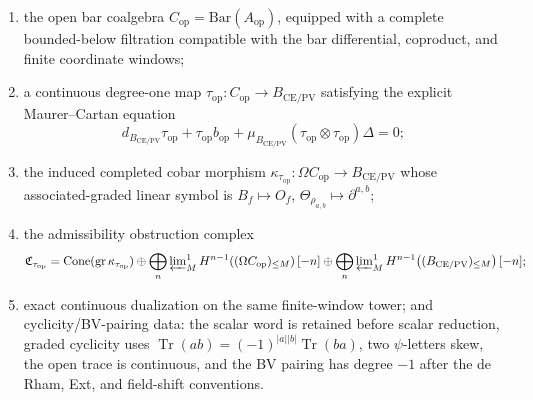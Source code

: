 \documentclass[11pt]{memoir}
\begin{document}
\begin{defn}
\begin{enumerate}[label=(K\arabic*)]
\[        C^\bullet_{\mathrm{CE},\mathrm{cont}}(\mathfrak g_{\mathrm{adm}})
          \cong
        \mathrm{PV}\bigl(
          \widehat{\mathbf S}_{\mathrm{coord}}(\mathfrak h_{\mathrm{adm}})
        \bigr),
      \]
      with the generator dictionary \(c^\rho\mapsto\partial_\rho\),
      \(u_f\mapsto O_f\), and
      \(d_{\mathrm{CE}}u_f\mapsto X_f\);
    \item the open bar coalgebra
      \(C_{\mathrm{op}}=\mathrm{Bar}(A_{\mathrm{op}})\), equipped with
      a complete bounded-below filtration compatible with the bar
      differential, coproduct, and finite coordinate windows;
    \item a continuous degree-one map
      \(\tau_{\mathrm{op}}\colon C_{\mathrm{op}}\to B_{\mathrm{CE/PV}}\)
      satisfying the explicit Maurer--Cartan equation
      \[
        d_{B_{\mathrm{CE/PV}}}\tau_{\mathrm{op}}
        +\tau_{\mathrm{op}} b_{\mathrm{op}}
        +\mu_{B_{\mathrm{CE/PV}}}
          (\tau_{\mathrm{op}}\otimes\tau_{\mathrm{op}})\Delta
        =0;
      \]
    \item the induced completed cobar morphism
      \(\kappa_{\tau_{\mathrm{op}}}\colon\Omega C_{\mathrm{op}}\to
      B_{\mathrm{CE/PV}}\) whose associated-graded linear symbol is
      \(B_f\mapsto O_f\), \(\Theta_{\rho_{a,b}}\mapsto\partial^{a,b}\);
    \item the admissibility obstruction complex
      \[
        \mathfrak C_{\tau_{\mathrm{op}}}
          =
        \operatorname{Cone}(
          \operatorname{gr}\kappa_{\tau_{\mathrm{op}}})
          \oplus
        \bigoplus_n\varprojlim\nolimits^1_M
          H^{n-1}\!\left((\Omega C_{\mathrm{op}})_{\leq M}\right)[-n]
          \oplus
        \bigoplus_n\varprojlim\nolimits^1_M
          H^{n-1}\!\left((B_{\mathrm{CE/PV}})_{\leq M}\right)[-n];
      \]
    \item exact continuous dualization on the same finite-window tower;
      and cyclicity/BV-pairing data: the scalar word is retained
      before scalar reduction, graded cyclicity uses
      \(\operatorname{Tr}(ab)=(-1)^{|a||b|}\operatorname{Tr}(ba)\), two
      \(\psi\)-letters skew, the open trace is continuous, and the BV
      pairing has degree \(-1\) after the de Rham, Ext, and field-shift
      conventions.
  \end{enumerate}
\end{defn}
\end{document}
